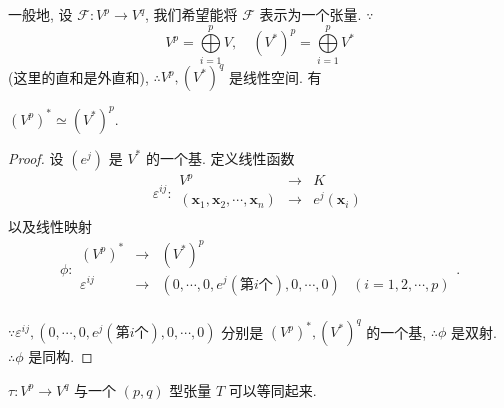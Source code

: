 \documentclass{ctexart}
\begin{document}
一般地, 设 $\mathcal{F}:V^p\to V^q$, 我们希望能将 $\mathcal{F}$ 表示为一个张量. $\because$
\[V^p=\bigoplus\limits_{i=1}^pV,\quad (V^*)^p=\bigoplus\limits_{i=1}^pV^*\]
(这里的直和是外直和), $\therefore V^p,(V^*)^q$ 是线性空间. 有
\begin{lemma}\label{l1.1}
    $(V^p)^*\simeq(V^*)^p$.
\end{lemma}
\begin{proof}
    设 $(e^j)$ 是 $V^*$ 的一个基. 定义线性函数
    \[\varepsilon^{ij}:\begin{array}{rcl}
        V^p & \to & K \\
        (\boldsymbol{x}_1,\boldsymbol{x}_2,\cdots,\boldsymbol{x}_n) & \to & e^j(\boldsymbol{x}_i) \\
    \end{array}\]
    以及线性映射
    \[\phi:\begin{array}{rcll}
        (V^p)^* & \to & (V^*)^p \\
        \varepsilon^{ij} & \to & (0,\cdots,0,e^j(\text{第}i\text{个}),0,\cdots,0) & (i=1,2,\cdots,p) \\
    \end{array}.\]

    $\because\varepsilon^{ij},(0,\cdots,0,e^j(\text{第}i\text{个}),0,\cdots,0)$ 分别是 $(V^p)^*,(V^*)^q$ 的一个基, $\therefore\phi$ 是双射. $\therefore\phi$ 是同构.
\end{proof}
\begin{theorem}\label{t1.3}
    $\tau:V^p\to V^q$ 与一个 $(p,q)$ 型张量 $T$ 可以等同起来.
\end{theorem}
\end{document}
